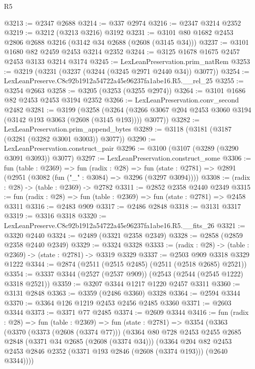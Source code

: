 \begin{lexlean}{R5}
\begin{coremodule}
@3213 := @2347 @2688
@3214 := @337 @2974
@3216 := @2347 @3214 @2352
@3219 := @3212 (@3213 @3216) @3192
@3231 := @3101 @80 @1682 @2453 @2806 @2688 @3216 (@3142 @34 @2688 (@2608 (@3145 @34)))
@3237 := @3101 @1680 @82 @2459 @2453 @3214 @2352
@3244 := @3125 @1678 @1675 @2457 @2453 @3133 @3214 @3174
@3245 := LexLeanPreservation.prim_natRem
@3253 := @3219 (@3231 (@3237 (@3244 (@3245 @2971 @2440 @34)) @3077))
@3254 := LexLeanPreserve.C8c92b1912a54722a45e96237fa1abe16.R5.__rel_25
@3255 := @3254 @2663
@3258 := @3205 (@3253 (@3255 @2974))
@3264 := @3101 @1686 @82 @2453 @2453 @3194 @2352
@3266 := LexLeanPreservation.conv_second @2482
@3281 := @3199
    (@3258
      (@3264 (@3266 @3067 @204 @2453 @3060 @3194 (@3142 @193 @3063 (@2608 (@3145 @193)))) @3077))
@3282 := LexLeanPreservation.prim_append_bytes
@3289 := @3118 (@3181 (@3187 (@3281 (@3282 @3001 @3003)) @3077))
@3290 := LexLeanPreservation.construct_pair
@3296 := @3100 (@3107 (@3289 (@3290 @3091 @3093)) @3077)
@3297 := LexLeanPreservation.construct_some
@3306 := fun (table : @2369) =>
  fun (radix : @28) =>
  fun (state : @2781) => @2891 (@2951 (@3082 (fun ("_" : @3084) => @3296 (@3297 @3094))))
@3308 := (radix : @28) -> (table : @2369) -> @2782
@3311 := @2852 @2358 @2440 @2349
@3315 := fun (radix : @28) => fun (table : @2369) => fun (state : @2781) => @2458 @3311
@3316 := @2483 @909
@3317 := @2486 @2848
@3318 := @3131 @3317
@3319 := @3316 @3318
@3320 := LexLeanPreserve.C8c92b1912a54722a45e96237fa1abe16.R5.__fits_26
@3321 := @3320 @2440
@3324 := @2489 (@3321 @2358 @2349)
@3328 := @2858 (@2859 @2358 @2440 @2349)
@3329 := @3324 @3328
@3333 := (radix : @28) -> (table : @2369) -> (state : @2781) -> @3319 @3329
@3337 := @2503 @909 @3318 @3329 @1222
@3344 := @2874 (@2511 (@2515 @2485) (@2511 (@2518 @2685) @2521))
@3354 := @3337 @3344 (@2527 (@2537 @909)) (@2543 (@2544 (@2545 @1222) @3318 @2521))
@3359 := @3207 @3344 @1217 @1220 @2457 @3311
@3360 := @3131 @2848
@3363 := @3359 (@2486 @3360) @3328
@3364 := @2594 @3344
@3370 := @3364 @126 @1219 @2453 @2456 @2485 @3360
@3371 := @2603 @3344
@3373 := @3371 @77 @2485
@3374 := @2609 @3344
@3416 := fun (radix : @28) =>
  fun (table : @2369) =>
  fun (state : @2781) =>
  @3354
    (@3363
      (@3370
        (@3373 (@2608 (@3374 @77)))
        (@3364
          @80
          @728
          @2453
          @2455
          @2685
          @2848
          (@3371 @34 @2685 (@2608 (@3374 @34)))
          (@3364
            @204
            @82
            @2453
            @2453
            @2846
            @2352
            (@3371 @193 @2846 (@2608 (@3374 @193)))
            (@2640 @3344))))

\end{coremodule}
\end{lexlean}
